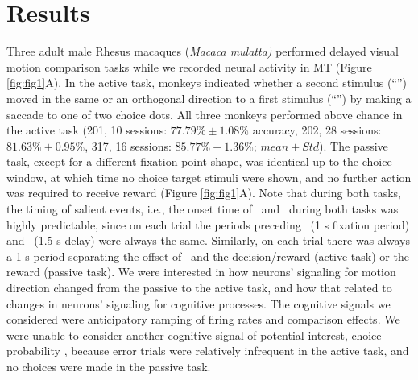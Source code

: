 \section{Results}
Three adult male Rhesus macaques (\textit{Macaca mulatta)} performed delayed visual motion comparison tasks while we recorded neural activity in MT (Figure \ref{fig:fig1}A). 
In the active task, monkeys indicated whether a second stimulus (``\test'') moved in the same or an orthogonal direction to a first stimulus (``\sample'') by making a saccade to one of two choice dots. 
All three monkeys performed above chance in the active task (201, 10 sessions: $77.79\% \pm 1.08\%$ accuracy, 202, 28 sessions: $81.63\% \pm 0.95\%$, 317, 16 sessions: $85.77\% \pm 1.36\%$; $mean \pm Std$). 
The passive task, except for a different fixation point shape, was identical up to the choice window, at which time no choice target stimuli were shown, and no further action was required to receive reward (Figure \ref{fig:fig1}A). 
Note that during both tasks, the timing of salient events, i.e., the onset time of \sample\ and \test\ during both tasks was highly predictable, since on each trial the periods preceding \sample\ (1 s fixation period) and \test\ (1.5 s delay) were always the same. 
Similarly, on each trial there was always a 1 s period separating the offset of \test\ and the decision/reward (active task) or the reward (passive task).
We were interested in how neurons' signaling for motion direction changed from the passive to the active task, and how that related to changes in neurons' signaling for cognitive processes.
The cognitive signals we considered were anticipatory ramping of firing rates and comparison effects. We were unable to consider another cognitive signal of potential interest, choice probability \parencite{britten1996}, because error trials were relatively infrequent in the active task, and no choices were made in the passive task.



